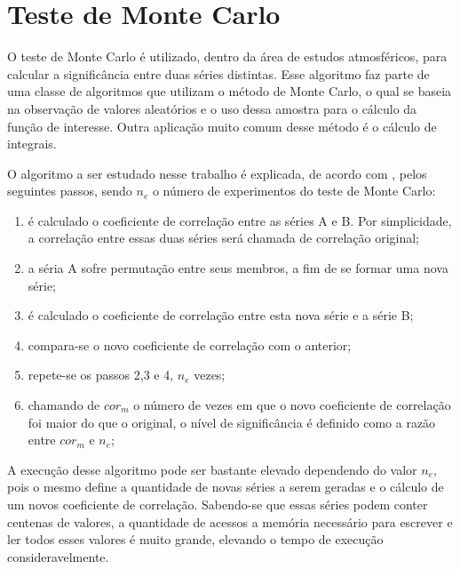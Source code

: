 \section{Teste de Monte Carlo}

O teste de Monte Carlo é utilizado, dentro da área de estudos atmosféricos, para calcular a significância entre duas séries distintas. Esse algoritmo faz parte de uma classe de algoritmos que utilizam o método de Monte Carlo, o qual se baseia na observação de valores aleatórios e o uso dessa amostra para o cálculo da função de interesse. Outra aplicação muito comum desse método é o cálculo de integrais.

O algoritmo a ser estudado nesse trabalho é explicada, de acordo com \cite{Joao:2010}, pelos seguintes passos, sendo $n_{e}$ o número de experimentos do teste de Monte Carlo:

\begin{enumerate}
\item  é calculado o coeficiente de correlação entre as séries A e B. Por simplicidade, a correlação entre essas duas séries será chamada de correlação original;

\item  a séria A sofre permutação entre seus membros, a fim de se formar uma nova série;

\item  é calculado o coeficiente de correlação entre esta nova série e a série B;

\item  compara-se o novo coeficiente de correlação com o anterior;

\item  repete-se os passos 2,3 e 4, $n_{e}$ vezes;

\item  chamando de $cor_{m}$ o número de vezes em que o novo coeficiente de correlação foi maior do que o original, o nível de significância é definido como a razão entre $cor_{m}$ e $n_{e}$;
\end{enumerate}

A execução desse algoritmo pode ser bastante elevado dependendo do valor $n_{e}$, pois o mesmo define a quantidade de novas séries a serem geradas e o cálculo de um novos coeficiente de correlação. Sabendo-se que essas séries podem conter centenas de valores, a quantidade de acessos a memória necessário para escrever e ler todos esses valores é muito grande, elevando o tempo de execução consideravelmente.